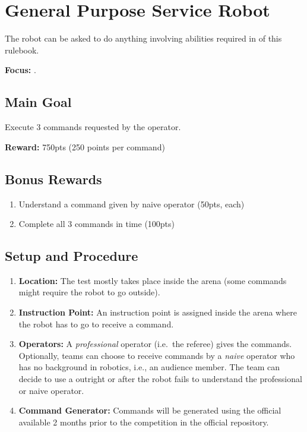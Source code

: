 \section{General Purpose Service Robot}
\label{test:gpsr}
The robot can be asked to do anything involving abilities required in \SONE{} of this rulebook.

\noindent \textbf{Focus:} \SysI.

\subsection*{Main Goal}
Execute 3 commands requested by the operator.

\noindent\textbf{Reward:} 750pts (250 points per command)

\subsection*{Bonus Rewards}
\begin{enumerate}[nosep]
	\item Understand a command given by naive operator (50pts, each)
	\item Complete all 3 commands in time (100pts)
\end{enumerate}

%
%
\subsection*{Setup and Procedure}
\begin{enumerate}[nosep]
	\item \textbf{Location:} The test mostly takes place inside the arena (some commands might require the robot to go outside).
	
	\item \textbf{Instruction Point:} An instruction point is assigned inside the arena where the robot has to go to receive a command.
	
	\item \textbf{Operators:} A \emph{professional} operator (i.e.~the referee) gives the commands. Optionally, teams can choose to receive commands by a \emph{naive} operator who has no background in robotics, i.e., an audience member. The team can decide to use a \CustomOperator{} outright or after the robot fails to understand the professional or naive operator.
	
	\item \textbf{Command Generator:} Commands will be generated using the official \CommandGen{} available 2 months prior to the competition in the official repository\footnotemark {}.
\end{enumerate}


